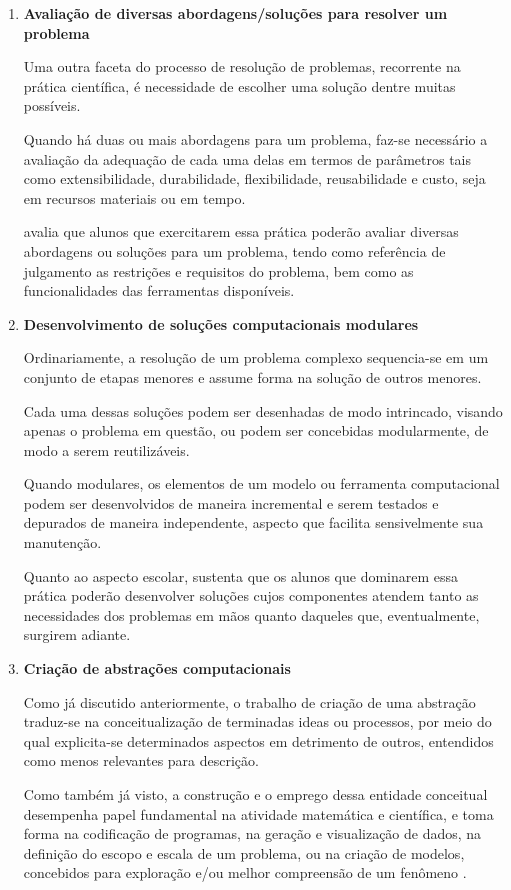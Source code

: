 \begin{enumerate}
  \item \textbf{Avaliação de diversas abordagens/soluções para resolver um problema} 

  Uma outra faceta do processo de resolução de problemas, recorrente na prática científica, é necessidade de escolher uma solução dentre muitas possíveis.

  Quando há duas ou mais abordagens para um problema, faz-se necessário a avaliação da adequação de cada uma delas em termos de parâmetros tais como extensibilidade, durabilidade, flexibilidade, reusabilidade e custo, seja em recursos materiais ou em tempo.

   avalia que alunos que exercitarem essa prática poderão avaliar diversas abordagens ou soluções para um problema, tendo como referência de julgamento as restrições e requisitos do problema, bem como as funcionalidades das ferramentas disponíveis. 

  \item \textbf{Desenvolvimento de soluções computacionais modulares} 

  Ordinariamente, a resolução de um problema complexo sequencia-se em um conjunto de etapas menores e assume forma na solução de outros menores. 
  
  Cada uma dessas soluções podem ser desenhadas de modo intrincado, visando apenas o problema em questão, ou podem ser concebidas modularmente, de modo a serem reutilizáveis.

  Quando modulares, os elementos de um modelo ou ferramenta computacional podem ser desenvolvidos de maneira incremental e serem testados e depurados de maneira independente, aspecto que facilita sensivelmente sua manutenção.

  Quanto ao aspecto escolar,  sustenta que os alunos que dominarem essa prática poderão desenvolver soluções cujos componentes atendem tanto as necessidades dos problemas em mãos quanto daqueles que, eventualmente, surgirem adiante. 

  \item \textbf{Criação de abstrações computacionais} 

  Como já discutido anteriormente, o trabalho de criação de uma abstração traduz-se na conceitualização de terminadas ideas ou processos, por meio do qual explicita-se determinados aspectos em detrimento de outros, entendidos como menos relevantes para descrição.

  Como também já visto, a construção e o emprego dessa entidade conceitual desempenha papel fundamental na atividade matemática e científica, e toma forma na codificação de programas, na geração e visualização de dados, na definição do escopo e escala de um problema, ou na criação de modelos, concebidos para exploração e/ou melhor compreensão de um fenômeno \cite{Weintrop2016}. 


\end{enumerate}
